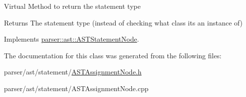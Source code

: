 Virtual Method to return the statement type \begin{DoxyReturn}{Returns}
The statement type (instead of checking what class it\textquotesingle{}s an instance of) 
\end{DoxyReturn}


Implements \hyperlink{classparser_1_1ast_1_1ASTStatementNode_ac381d35d12f774a1bab0e209c5bfec1f}{parser\+::ast\+::\+A\+S\+T\+Statement\+Node}.



The documentation for this class was generated from the following files\+:\begin{DoxyCompactItemize}
\item 
parser/ast/statement/\hyperlink{ASTAssignmentNode_8h}{A\+S\+T\+Assignment\+Node.\+h}\item 
parser/ast/statement/A\+S\+T\+Assignment\+Node.\+cpp\end{DoxyCompactItemize}
